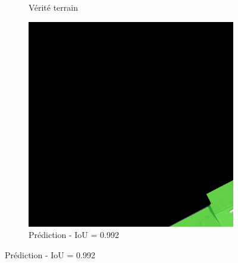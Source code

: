 \begin{figure}[H]
\begin{subfigure}{0.32\textwidth}
    \caption{Vérité terrain}
\end{subfigure}
\hfill
\begin{subfigure}{0.32\textwidth}
    \includegraphics[width=\textwidth]{02-main//figures/ch4/kfold_ensembles/linknet_timm-efficientnet-b5/best_cases/best_4_iou0.992_24931113_tile_13_18_a66e08_overlay_pred.png}
    \caption{Prédiction - IoU = 0.992}
\end{subfigure}

\vspace{0.35cm}


\end{figure}
